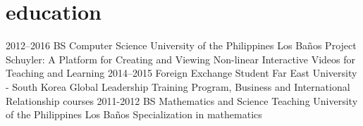 \documentclass[]{friggeri-cv}
\begin{document}
\section{education}

\begin{entrylist}
  \entry
    {2012–2016}
    {BS Computer Science}
    {University of the Philippines Los Ba{\~{n}}os}
    {Project Schuyler: A Platform for Creating and Viewing Non-linear Interactive Videos for Teaching and Learning}
  \entry
    {2014–2015}
    {Foreign Exchange Student}
    {Far East University - South Korea}
    {Global Leadership Training Program, Business and International Relationship courses}
  \entry
    {2011-2012}
    {BS Mathematics and Science Teaching}
    {University of the Philippines Los Ba{\~{n}}os}
    {Specialization in mathematics}
\end{entrylist}
\end{document}
